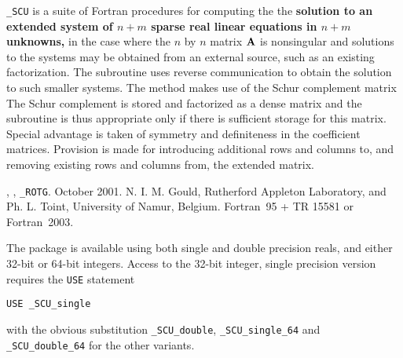 \documentclass{galahad}
\newcommand{\packagename}{SCU}
\newcommand{\fullpackagename}{\libraryname\-\_\-\packagename}
\begin{document}
\galheader


\galsummary

{\tt \fullpackagename} is a suite of Fortran procedures for 
computing the 
the {\bf solution to an extended system of $n + m$ 
sparse real linear equations in $n  +  m$ unknowns,} 
in the case where the $n$ by $n$ matrix ${\mathbf{A}}$ is nonsingular 
and solutions to the systems 
may be obtained from an external source, such as an existing 
factorization.  The subroutine uses reverse communication to obtain 
the solution to such smaller systems.  The method makes use of 
the Schur complement matrix 
The Schur complement is stored and factorized as a dense matrix 
and the subroutine is thus appropriate only if there is 
sufficient storage for this matrix. Special advantage is taken 
of symmetry and definiteness in the coefficient matrices. 
Provision is made for introducing additional rows and columns 
to, and removing existing rows and columns from, the extended 
matrix. 
 

\galattributes
\galversions{\tt  \fullpackagename\_single, \fullpackagename\_double},
, {\tt \_ROTG}. 
\galdate October 2001.
\galorigin N. I. M. Gould, Rutherford Appleton Laboratory, and
Ph. L. Toint, University of Namur, Belgium.
\gallanguage Fortran~95 + TR 15581 or Fortran~2003. 


\galhowto

The package is available using both single and double precision reals, 
and either 32-bit or 64-bit integers. Access to the 32-bit integer,
single precision version requires the {\tt USE} statement
\medskip

\hspace{8mm} {\tt USE \fullpackagename\_single}

\medskip
\noindent
with the obvious substitution {\tt \fullpackagename\_double},
{\tt \fullpackagename\_single\_64} and 
{\tt \fullpackagename\_double\_64} for the other variants.
\end{document}
